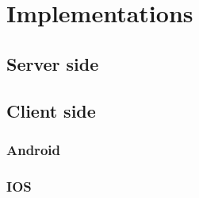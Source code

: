 \section{Implementations}
  \subsection{Server side}
  \subsection{Client side}
    \subsubsection{Android}
    \subsubsection{IOS}
